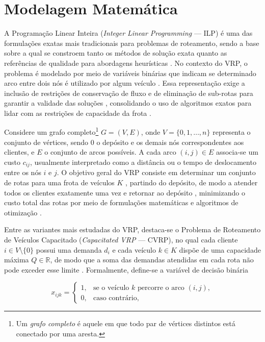 \section{Modelagem Matemática}

A Programação Linear Inteira (\textit{Integer Linear Programming} --- ILP) é uma das formulações exatas mais tradicionais para problemas de roteamento, sendo a base sobre a qual se constroem tanto os métodos de solução exata quanto as referências de qualidade para abordagens heurísticas \cite{toth2002vehicle, balas1983branch}. No contexto do VRP, o problema é modelado por meio de variáveis binárias que indicam se determinado arco entre dois nós é utilizado por algum veículo \cite{laporte1992vehicle}. Essa representação exige a inclusão de restrições de conservação de fluxo e de eliminação de sub-rotas para garantir a validade das soluções \cite{miller1960integer, desrochers1991improvements}, consolidando o uso de algoritmos exatos para lidar com as restrições de capacidade da frota \cite{baldacci2010exact, baldacci2010exact}.

Considere um grafo completo\footnote{Um \textit{grafo completo} é aquele em que todo par de vértices distintos está conectado por uma aresta.} $G = (V, E)$, onde $V = \{0, 1, \ldots, n\}$ \cite{applegate2011traveling} representa o conjunto de vértices, sendo $0$ o depósito e os demais nós correspondentes aos clientes, e $E$ o conjunto de arcos possíveis. A cada arco $(i,j) \in E$ associa-se um custo $c_{ij}$, usualmente interpretado como a distância ou o tempo de deslocamento entre os nós $i$ e $j$. O objetivo geral do VRP consiste em determinar um conjunto de rotas para uma frota de veículos $K$ \cite{dantzig1959truck}, partindo do depósito, de modo a atender todos os clientes exatamente uma vez e retornar ao depósito \cite{laporte2009fifty}, minimizando o custo total das rotas por meio de formulações matemáticas e algoritmos de otimização \cite{golden2008vehicle, desaulniers1998multi}.

Entre as variantes mais estudadas do VRP, destaca-se o Problema de Roteamento de Veículos Capacitado (\textit{Capacitated VRP} --- CVRP), no qual cada cliente $i \in V \setminus \{0\}$ possui uma demanda $d_i$ e cada veículo $k \in K$ dispõe de uma capacidade máxima $Q \in \mathbb{R}$, de modo que a soma das demandas atendidas em cada rota não pode exceder esse limite \cite{huang_solving_nodate}. Formalmente, define-se a variável de decisão binária

\begin{equation}
    x_{ijk} =
    \begin{cases}
        1, & \text{se o veículo } k \text{ percorre o arco } (i,j), \\
        0, & \text{caso contrário,}
    \end{cases}
    \label{eq:var_decisao}
\end{equation}

